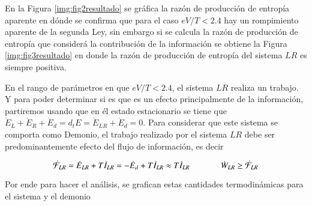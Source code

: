 En la Figura \ref{img:fig2resultado} se gráfica la razón de producción de entropía aparente en dónde se confirma que para el caso $eV/T<2.4$ hay un rompimiento aparente de la segunda Ley, sin embargo si se calcula la razón de producción de entropía que considerá la contribución de la información se obtiene la Figura \ref{img:fig3resultado} en donde la razón de producción de entropía del sistema $LR$ es siempre positiva.


En el rango de parámetros en que $eV/T<2.4$, el sistema $LR$ realiza un trabajo. Y para poder determinar si es que es un efecto principalmente de la información, partiremos usando que en él estado estacionario se tiene que $ \dot{E}_{L}+\dot{E}_{R}+\dot{E}_{d} = d_{t}E = \dot{E}_{LR} + \dot{E}_{d}=0$. Para considerar que este sistema se comporta como Demonio, el trabajo realizado por el sistema $LR$ debe ser predominantemente efecto del flujo de información, es decir

\begin{equation*}
    \dot{\mathcal{F}}_{LR} =  \dot{E}_{LR} + T\dot{I}_{LR} = -\dot{E}_{d} + T\dot{I}_{LR} \approx T\dot{I}_{LR}  \hspace{13mm} \dot{W}_{LR} \geq \dot{\mathcal{F}}_{LR}
\end{equation*}

Por ende para hacer el análisis, se grafican estas cantidades termodinámicas para el sistema y el demonio 


